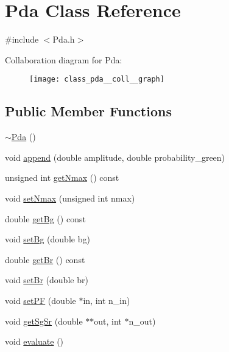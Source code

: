 \hypertarget{class_pda}{}\section{Pda Class Reference}
\label{class_pda}


{\ttfamily \#include $<$Pda.\+h$>$}



Collaboration diagram for Pda\+:
\nopagebreak
\begin{figure}[H]
\begin{center}
\leavevmode
\texttt{[image: class\_pda\_\_coll\_\_graph]}
\end{center}
\end{figure}
\subsection*{Public Member Functions}
\begin{DoxyCompactItemize}
\item 
\hyperlink{class_pda_a9c72f6be70a8718284328f735b79374c}{$\sim$\+Pda} ()
\item 
void \hyperlink{class_pda_a4b71f2d58129c8db45c6779b0c1734d1}{append} (double amplitude, double probability\+\_\+green)
\item 
unsigned int \hyperlink{class_pda_aca50144f22170263ef05997e5eefeff6}{get\+Nmax} () const
\item 
void \hyperlink{class_pda_a76f55e8d719aaace0f26ed1b47ed0bb4}{set\+Nmax} (unsigned int nmax)
\item 
double \hyperlink{class_pda_a769d8bdf3a739d421e226e126aae2d42}{get\+Bg} () const
\item 
void \hyperlink{class_pda_a64baea621f7aef17b43ee65b2a0c0aff}{set\+Bg} (double bg)
\item 
double \hyperlink{class_pda_adc2d16391e665139ea51a3489e7d8e3c}{get\+Br} () const
\item 
void \hyperlink{class_pda_a8890b9df42265440d7ce534bb8a95887}{set\+Br} (double br)
\item 
void \hyperlink{class_pda_adf5dfce658c8816392b933c3571520ea}{set\+PF} (double $\ast$in, int n\+\_\+in)
\item 
void \hyperlink{class_pda_a15729ff6d80f086e7f6ae4232444dc05}{get\+Sg\+Sr} (double $\ast$$\ast$out, int $\ast$n\+\_\+out)
\item 
void \hyperlink{class_pda_a754b1fe7d049bab1ee039471b3e461a9}{evaluate} ()
\end{DoxyCompactItemize}


